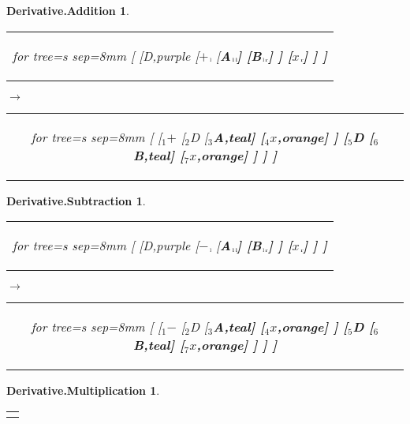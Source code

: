\documentclass[UTF8,10pt]{ctexart}
\newcommand{\Bigskip}{\bigskip\medskip}
\newcommand{\subtreeA}{\bf A}
\newcommand{\subtreeB}{\bf B}
\newcommand{\I}{$_{\scriptscriptstyle 1}$}
\newcommand{\II}{$_{\scriptscriptstyle 2}$}
\newcommand{\III}{$_{\scriptscriptstyle 3}$}
\newcommand{\IV}{$_{\scriptscriptstyle 4}$}
\newcommand{\V}{$_{\scriptscriptstyle 5}$}
\newcommand{\VI}{$_{\scriptscriptstyle 6}$}
\newcommand{\VII}{$_{\scriptscriptstyle 7}$}
\newcommand{\lc}{$_{\:\!\scriptscriptstyle\rm l\!}$}
\newcommand{\rc}{$_{\:\!\scriptscriptstyle\rm r\!}$}
\newcommand{\Derivative}{\rm D}
\newcommand{\x}{$x$}
\newcommand{\Addition}{$+$}
\newcommand{\Subtraction}{$-$}
\newtheorem*{Derivative.Addition}{\bf Derivative.Addition }
\newtheorem*{Derivative.Subtraction}{\bf Derivative.Subtraction }
\newtheorem*{Derivative.Multiplication}{\bf Derivative.Multiplication }
\begin{document}
	\begin{center}\vspace*{\fill}
		\begin{Derivative.Addition}
			\qquad\par\Bigskip
			\begin{tabular}{c}
				\begin{forest}
					for tree={s sep=8mm}
					[
						[\Derivative,purple
							[\Addition\lc
								[\subtreeA\lc\lc]
								[\subtreeB\lc\rc]
							]
							[\x\rc]
						]
					]
				\end{forest}
			\end{tabular}
			\qquad
			$\longrightarrow$
			\qquad
			\begin{tabular}{c}
				\begin{forest}
					for tree={s sep=8mm}
					[
						[\I\Addition
							[\II\Derivative
								[\III\subtreeA,teal]
								[\IV\x,orange]
							]
							[\V\Derivative
								[\VI\subtreeB,teal]
								[\VII\x,orange]
							]
						]
					]
				\end{forest}
			\end{tabular}
		\end{Derivative.Addition}
		\bigskip
		\begin{Derivative.Subtraction}
			\qquad\par\Bigskip
			\begin{tabular}{c}
				\begin{forest}
					for tree={s sep=8mm}
					[
						[\Derivative,purple
							[\Subtraction\lc
								[\subtreeA\lc\lc]
								[\subtreeB\lc\rc]
							]
							[\x\rc]
						]
					]
				\end{forest}
			\end{tabular}
			\qquad
			$\longrightarrow$
			\qquad
			\begin{tabular}{c}
				\begin{forest}
					for tree={s sep=8mm}
					[
						[\I\Subtraction
							[\II\Derivative
								[\III\subtreeA,teal]
								[\IV\x,orange]
							]
							[\V\Derivative
								[\VI\subtreeB,teal]
								[\VII\x,orange]
							]
						]
					]
				\end{forest}
			\end{tabular}
		\end{Derivative.Subtraction}
		\bigskip
		\begin{Derivative.Multiplication}
			\qquad\par\Bigskip
			\begin{tabular}{c}
				\begin{forest}

\end{forest}
\end{tabular}
\end{Derivative.Multiplication}
\end{center}
\end{document}
